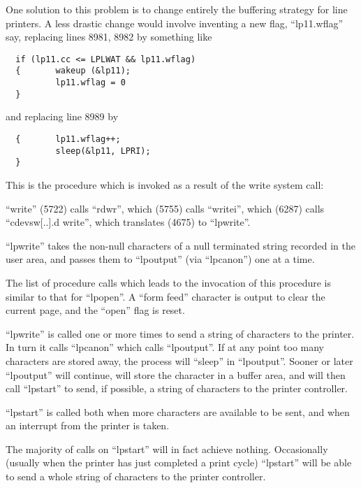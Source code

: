 One solution to this problem is to
change entirely the buffering strategy
for line printers. A less drastic
change would involve inventing a new
flag, ``lp11.wflag'' say, replacing lines
8981, 8982 by something like

\begin{verbatim}
  if (lp11.cc <= LPLWAT && lp11.wflag)
  {       wakeup (&lp11);
          lp11.wflag = 0
  }
\end{verbatim}

\noindent and replacing line 8989 by

\begin{verbatim}
  {       lp11.wflag++;
          sleep(&lp11, LPRI);
  }
\end{verbatim}


This is the procedure which is invoked
as a result of the write system call:

``write'' (5722) calls ``rdwr'',
which (5755) calls ``writei'',
which        (6287)         calls
``cdevsw[..].d write'',       which
translates (4675) to ``lpwrite''.

``lpwrite'' takes the non-null characters
of a null terminated string recorded in
the user area, and passes them to
``lpoutput'' (via ``lpcanon'') one at a
time.

The list of procedure calls which leads
to the invocation of this procedure is
similar to that for ``lpopen''. A ``form
feed'' character is output to clear the
current page, and the ``open'' flag is
reset.


``lpwrite'' is called one or more times
to send a string of characters to the
printer. In turn it calls ``lpcanon''
which calls ``lpoutput''. If at any point
too many characters are stored away,
the process will ``sleep'' in ``lpoutput''.
Sooner or later ``lpoutput'' will continue, will store the character in a
buffer area, and will then call
``lpstart'' to send, if possible, a
string of characters to the printer
controller.

``lpstart'' is called both when more
characters are available to be sent,
and when an interrupt from the printer
is taken.

The majority of calls on ``lpstart'' will
in fact achieve nothing. Occasionally
(usually when the printer has just completed
a print cycle) ``lpstart'' will be
able to send a whole string of characters to the printer controller.


